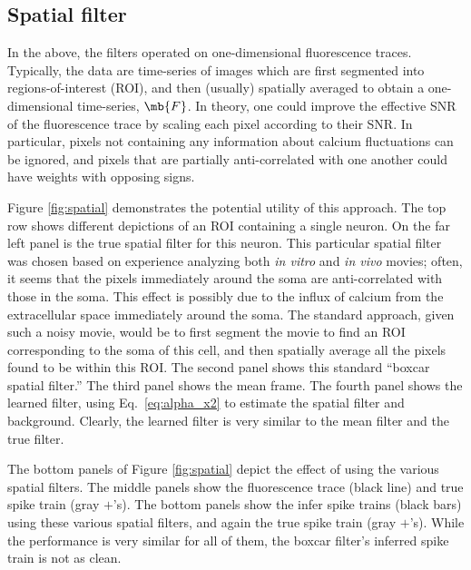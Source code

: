 \subsection{Spatial filter} \label{sec:results:spatial}

In the above, the filters operated on one-dimensional fluorescence traces. Typically, the data are time-series of images which are first segmented into regions-of-interest (ROI), and then (usually) spatially averaged to obtain a one-dimensional time-series, $\mb{F}$.  In theory, one could improve the effective SNR of the fluorescence trace by scaling each pixel according to their SNR.  In particular, pixels not containing any information about calcium fluctuations can be ignored, and pixels that are partially anti-correlated with one another could have weights with opposing signs.  

Figure \ref{fig:spatial} demonstrates the potential utility of this approach.  The top row shows different depictions of an ROI containing a single neuron.  On the far left panel is the true spatial filter for this neuron.  This particular spatial filter was chosen based on experience analyzing both \emph{in vitro} and \emph{in vivo} movies; often, it seems that the pixels immediately around the soma are anti-correlated with those in the soma.  This effect is possibly due to the influx of calcium from the extracellular space immediately around the soma.   The standard approach, given such a noisy movie, would be to first segment the movie to find an ROI corresponding to the soma of this cell, and then spatially average all the pixels found to be within this ROI.  The second panel shows this standard ``boxcar spatial filter.''  The third panel shows the mean frame. The fourth panel shows the learned filter, using Eq.~\eqref{eq:alpha_x2} to estimate the spatial filter and background. Clearly, the learned filter is very similar to the mean filter and the true filter. 

The bottom panels of Figure \ref{fig:spatial} depict the effect of using the various spatial filters. The middle panels show the fluorescence trace (black line) and true spike train (gray $+$'s).  The bottom panels show the infer spike trains (black bars) using these various spatial filters, and again the true spike train (gray $+$'s).  While the performance is very similar for all of them, the boxcar filter's inferred spike train is not as clean.  




